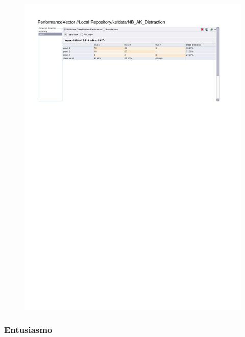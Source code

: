 \begin{figure}[htp]
  \centerline{\includegraphics[trim=0 680 0 60,clip,width=16.09cm]{results/NB_K_Distraction.pdf}} \caption{
} \label{NB_K_Distraction}
\end{figure}

\clearpage
\FloatBarrier
\subsubsection{Entusiasmo}

